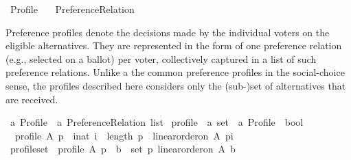 %
\begin{isabellebody}%
%
%
\isadelimdocument
\isanewline
%
\endisadelimdocument
%
\isatagdocument
\isanewline
\isanewline
\isanewline
%
\isamarkuptrue%
%
\endisatagdocument
{\isafolddocument}%
%
\isadelimdocument
%
\endisadelimdocument
%
\isadelimtheory
%
\endisadelimtheory
%
\isatagtheory
{}\isamarkupfalse%
\ Profile\isanewline
\ \ \ Preference{\isacharunderscore}{\kern0pt}Relation\isanewline
{}%
\endisatagtheory
{\isafoldtheory}%
%
\isadelimtheory
%
\endisadelimtheory
%
\begin{isamarkuptext}%
Preference profiles denote the decisions made by the individual voters on
the eligible alternatives. They are represented in the form of one preference
relation (e.g., selected on a ballot) per voter, collectively captured in a
list of such preference relations.
Unlike a the common preference profiles in the social-choice sense, the
profiles described here considers only the (sub-)set of alternatives that are
received.%
\end{isamarkuptext}\isamarkuptrue%
%
\isadelimdocument
%
\endisadelimdocument
%
\isatagdocument
%
\isamarkuptrue%
%
\endisatagdocument
{\isafolddocument}%
%
\isadelimdocument
%
\endisadelimdocument
{}\isamarkupfalse%
\ {\isacharprime}{\kern0pt}a\ Profile\ {\isacharequal}{\kern0pt}\ {\isachardoublequoteopen}{\isacharparenleft}{\kern0pt}{\isacharprime}{\kern0pt}a\ Preference{\isacharunderscore}{\kern0pt}Relation{\isacharparenright}{\kern0pt}\ list{\isachardoublequoteclose}\isanewline
\isanewline
\isanewline
{}\isamarkupfalse%
\ profile\ {\isacharcolon}{\kern0pt}{\isacharcolon}{\kern0pt}\ {\isachardoublequoteopen}{\isacharprime}{\kern0pt}a\ set\ {\isasymRightarrow}\ {\isacharprime}{\kern0pt}a\ Profile\ {\isasymRightarrow}\ bool{\isachardoublequoteclose}\ \isanewline
\ \ {\isachardoublequoteopen}profile\ A\ p\ {\isasymequiv}\ {\isasymforall}i{\isacharcolon}{\kern0pt}{\isacharcolon}{\kern0pt}nat{\isachardot}{\kern0pt}\ i\ {\isacharless}{\kern0pt}\ length\ p\ {\isasymlongrightarrow}\ linear{\isacharunderscore}{\kern0pt}order{\isacharunderscore}{\kern0pt}on\ A\ {\isacharparenleft}{\kern0pt}p{\isacharbang}{\kern0pt}i{\isacharparenright}{\kern0pt}{\isachardoublequoteclose}\isanewline
\isanewline
{}\isamarkupfalse%
\ profile{\isacharunderscore}{\kern0pt}set\ {\isacharcolon}{\kern0pt}\ {\isachardoublequoteopen}profile\ A\ p\ {\isasymequiv}\ {\isacharparenleft}{\kern0pt}{\isasymforall}b\ {\isasymin}\ {\isacharparenleft}{\kern0pt}set\ p{\isacharparenright}{\kern0pt}{\isachardot}{\kern0pt}\ linear{\isacharunderscore}{\kern0pt}order{\isacharunderscore}{\kern0pt}on\ A\ b{\isacharparenright}{\kern0pt}{\isachardoublequoteclose}\isanewline

\end{isabellebody}
